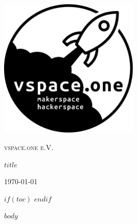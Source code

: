 \documentclass[12pt,a4paper]{article}
\begin{document}
\begin{titlepage}
	\centering
	\includegraphics[width=0.5\textwidth]{pics/logo.eps}\par\vspace{1cm}
	{\scshape\LARGE vspace.one e.V.\par}
	\vspace{1cm}
	{\scshape\Large $title$ \par}
	\vfill

	{\large \today\par}
\end{titlepage}

$if(toc)$
{
\tableofcontents
\clearpage
}
$endif$


$body$
\end{document}
